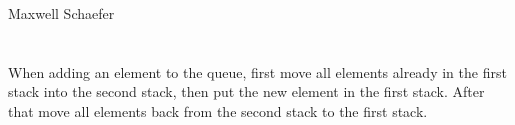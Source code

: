 \documentclass{article}
\begin{document}
    Maxwell Schaefer

    \section{}

    \section{}

    \section{}
        \subsection{}
        When adding an element to the queue, first move all elements already in the first stack into the second stack, then put the new element in the first stack. After that move all elements back from the second stack to the first stack.
\end{document}
